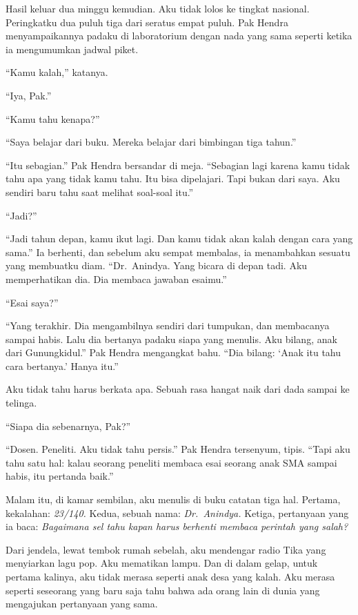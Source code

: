 \documentclass[11pt,twoside,openany]{book}
\begin{document}
Hasil keluar dua minggu kemudian. Aku tidak lolos ke tingkat nasional. Peringkatku dua puluh tiga dari seratus empat puluh. Pak Hendra menyampaikannya padaku di laboratorium dengan nada yang sama seperti ketika ia mengumumkan jadwal piket.

``Kamu kalah,'' katanya.

``Iya, Pak.''

``Kamu tahu kenapa?''

``Saya belajar dari buku. Mereka belajar dari bimbingan tiga tahun.''

``Itu sebagian.'' Pak Hendra bersandar di meja. ``Sebagian lagi karena kamu tidak tahu apa yang tidak kamu tahu. Itu bisa dipelajari. Tapi bukan dari saya. Aku sendiri baru tahu saat melihat soal-soal itu.''

``Jadi?''

``Jadi tahun depan, kamu ikut lagi. Dan kamu tidak akan kalah dengan cara yang sama.'' Ia berhenti, dan sebelum aku sempat membalas, ia menambahkan sesuatu yang membuatku diam. ``Dr.~Anindya. Yang bicara di depan tadi. Aku memperhatikan dia. Dia membaca jawaban esaimu.''

``Esai saya?''

``Yang terakhir. Dia mengambilnya sendiri dari tumpukan, dan membacanya sampai habis. Lalu dia bertanya padaku siapa yang menulis. Aku bilang, anak dari Gunungkidul.'' Pak Hendra mengangkat bahu. ``Dia bilang: `Anak itu tahu cara bertanya.' Hanya itu.''

Aku tidak tahu harus berkata apa. Sebuah rasa hangat naik dari dada sampai ke telinga.

``Siapa dia sebenarnya, Pak?''

``Dosen. Peneliti. Aku tidak tahu persis.'' Pak Hendra tersenyum, tipis. ``Tapi aku tahu satu hal: kalau seorang peneliti membaca esai seorang anak SMA sampai habis, itu pertanda baik.''

Malam itu, di kamar sembilan, aku menulis di buku catatan tiga hal. Pertama, kekalahan: \emph{23/140.} Kedua, sebuah nama: \emph{Dr.~Anindya.} Ketiga, pertanyaan yang ia baca: \emph{Bagaimana sel tahu kapan harus berhenti membaca perintah yang salah?}

Dari jendela, lewat tembok rumah sebelah, aku mendengar radio Tika yang menyiarkan lagu pop. Aku mematikan lampu. Dan di dalam gelap, untuk pertama kalinya, aku tidak merasa seperti anak desa yang kalah. Aku merasa seperti seseorang yang baru saja tahu bahwa ada orang lain di dunia yang mengajukan pertanyaan yang sama.
\end{document}

